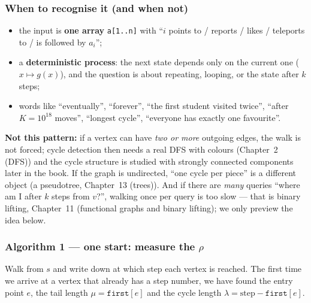 \subsubsection*{When to recognise it (and when not)}

\begin{itemize}[leftmargin=*]
    \item the input is \textbf{one array} \texttt{a[1..n]} with ``$i$ points to / reports / likes / teleports to / is followed by $a_i$'';
    \item a \textbf{deterministic process}: the next state depends only on the current one ($x \mapsto g(x)$), and the question is about repeating, looping, or the state after $k$ steps;
    \item words like ``eventually'', ``forever'', ``the first student visited twice'', ``after $K = 10^{18}$ moves'', ``longest cycle'', ``everyone has exactly one favourite''.
\end{itemize}
\textbf{Not this pattern:} if a vertex can have \emph{two or more} outgoing edges, the walk is not forced; cycle detection then needs a real DFS with colours (Chapter~2 (DFS)) and the cycle structure is studied with strongly connected components later in the book. If the graph is undirected, ``one cycle per piece'' is a different object (a pseudotree, Chapter~13 (trees)). And if there are \emph{many} queries ``where am I after $k$ steps from $v$?'', walking once per query is too slow --- that is binary lifting, Chapter~11 (functional graphs and binary lifting); we only preview the idea below.

\subsubsection*{Algorithm 1 --- one start: measure the $\rho$}

Walk from $s$ and write down at which step each vertex is reached. The first time we arrive at a vertex that already has a step number, we have found the entry point $e$, the tail length $\mu = \texttt{first}[e]$ and the cycle length $\lambda = \text{step} - \texttt{first}[e]$.

